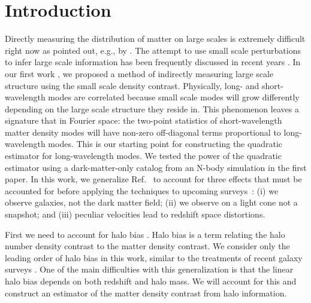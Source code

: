 \documentclass[prd,amsmath,amssymb,floatfix,superscriptaddress,nofootinbib,twocolumn]{revtex4-1}
\begin{document}
\section{Introduction} \label{sec1}
\noindent Directly measuring the distribution of matter on large scales is extremely difficult right now as pointed out, e.g., by \cite{Modi:2019hydr}. The attempt to use small scale perturbations to infer large scale information has been frequently discussed in recent years \cite{Baldauf:2011fer}\cite{Jeong:2012foss}\cite{Li:2014ssc}\cite{Zhu:2016tidal}\cite{Barreira:2017res}. In our first work \cite{Li:2020fir}, we proposed a method of indirectly measuring large scale structure using the small scale density contrast. Physically, long- and short-wavelength modes are correlated because small scale modes will grow differently depending on the large scale structure they reside in. This phenomenon leaves a signature that in Fourier space: the two-point statistics of short-wavelength matter density modes will have non-zero off-diagonal terms proportional to long-wavelength modes. This is our starting point for constructing the quadratic estimator for long-wavelength modes. We tested the power of the quadratic estimator using a dark-matter-only catalog from an N-body simulation in the first paper. In this work, we generalize Ref.~\cite{Li:2020fir} to account for three effects that must be accounted for before applying the techniques to upcoming surveys~\cite{LSST:2012ls}\cite{Wfirst:2012jg}\cite{DESI:2019ds}: (i) we observe galaxies, not the dark matter field; (ii) we observe on a light cone not a snapshot; and (iii) peculiar velocities lead to redshift space distortions.

First we need to account for halo bias \cite{Kravtsov:1999hb}\cite{Desjacques:2018rev} . Halo bias is a term relating the halo number density contrast to the matter density contrast. We consider only the leading order of halo bias in this work, similar to the treatments of recent galaxy surveys \cite{Seljak:2004sj}\cite{Chang:2016npo}\cite{Prat:2016xor}. One of the main difficulties with this generalization is that the linear halo bias depends on both redshift and halo mass. We will account for this and construct an estimator of the matter density contrast from halo information.
\end{document}
